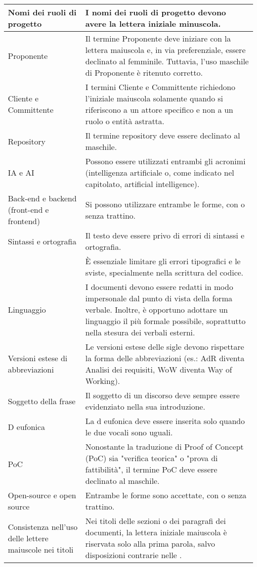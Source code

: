 \begin{adjustwidth}{-0.5cm}{-0.5cm}
\begin{longtable}{|P{4.5cm}|>{\raggedright\arraybackslash}P{9cm}|}
    Nomi dei ruoli di progetto & I nomi dei ruoli di progetto devono avere la lettera iniziale minuscola. \\
    \hline Proponente & Il termine Proponente deve iniziare con la lettera maiuscola e, in via preferenziale, essere declinato al femminile. Tuttavia, l'uso maschile di Proponente è ritenuto corretto.\\
    \hline Cliente e Committente & I termini Cliente e Committente richiedono l'iniziale maiuscola solamente quando si riferiscono a un attore specifico e non a un ruolo o entità astratta.\\
		\hline Repository & Il termine repository deve essere declinato al maschile.\\
    \hline IA e AI & Possono essere utilizzati entrambi gli acronimi (intelligenza artificiale o, come indicato nel capitolato, artificial intelligence).\\
    \hline Back-end e backend (front-end e frontend) & Si possono utilizzare entrambe le forme, con o senza trattino.\\
    \hline Sintassi e ortografia & Il testo deve essere privo di errori di sintassi e ortografia. \\
    \hline {} & È essenziale limitare gli errori tipografici e le sviste, specialmente nella scrittura del codice. \\
    \hline Linguaggio & I documenti devono essere redatti in modo impersonale dal punto di vista della forma verbale. Inoltre, è opportuno adottare un linguaggio il più formale possibile, soprattutto nella stesura dei verbali esterni. \\
    \hline Versioni estese di abbreviazioni & Le versioni estese delle sigle devono rispettare la forma delle abbreviazioni (es.: AdR diventa Analisi dei requisiti, WoW diventa Way of Working). \\
		\hline Soggetto della frase & Il soggetto di un discorso deve sempre essere evidenziato nella sua introduzione. \\
		\hline D eufonica & La d eufonica deve essere inserita solo quando le due vocali sono uguali. \\
		\hline PoC & Nonostante la traduzione di Proof of Concept (PoC) sia "verifica teorica" o "prova di fattibilità", il termine PoC deve essere declinato al maschile. \\
		\hline Open-source e open source & Entrambe le forme sono accettate, con o senza trattino. \\
		\hline Consistenza nell'uso delle lettere maiuscole nei titoli & Nei titoli delle sezioni o dei paragrafi dei documenti, la lettera iniziale maiuscola è riservata solo alla prima parola, salvo disposizioni contrarie nelle \NdP. \\

\end{longtable}
\end{adjustwidth}
